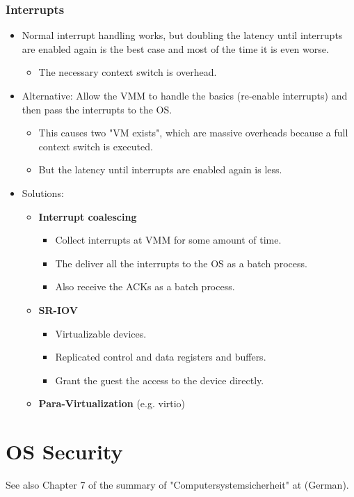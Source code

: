		\subsection{Interrupts}
			\begin{itemize}
				\item Normal interrupt handling works, but doubling the latency until interrupts are enabled again is the best case and most of the time it is even worse.
					\begin{itemize}
						\item The necessary context switch is overhead.
					\end{itemize}
				\item Alternative: Allow the VMM to handle the basics (re-enable interrupts) and then pass the interrupts to the OS.
					\begin{itemize}
						\item This causes two "VM exists", which are massive overheads because a full context switch is executed.
						\item But the latency until interrupts are enabled again is less.
					\end{itemize}
				\item Solutions:
					\begin{itemize}
						\item \textbf{Interrupt coalescing}
							\begin{itemize}
								\item Collect interrupts at VMM for some amount of time.
								\item The deliver all the interrupts to the OS as a batch process.
								\item Also receive the ACKs as a batch process.
							\end{itemize}
						\item \textbf{SR-IOV}
							\begin{itemize}
								\item Virtualizable devices.
								\item Replicated control and data registers and buffers.
								\item Grant the guest the access to the device directly.
							\end{itemize}
						\item \textbf{Para-Virtualization} (e.g. virtio)
					\end{itemize}
			\end{itemize}

\chapter{OS Security}
	See also Chapter 7 of the summary of "Computersystemsicherheit" at  (German).

